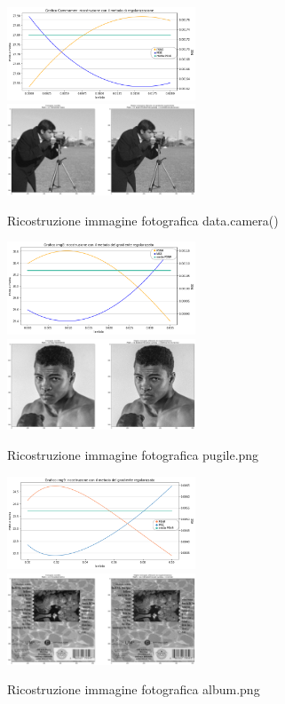 \begin{figure}[H]
    \includegraphics[width=0.5\textwidth]{IMMAGINI_RELAZIONE/graficoCameramanTik.png}
    \includegraphics[width=0.5\textwidth]{IMMAGINI_RELAZIONE/ricostruzioneCameramanTik.png}
    \caption{Ricostruzione immagine fotografica data.camera()}

    \includegraphics[width=0.5\textwidth]{IMMAGINI_RELAZIONE/graficoPugileTik.png}
    \includegraphics[width=0.5\textwidth]{IMMAGINI_RELAZIONE/ricostruzionePugileTik.png}
    \caption{Ricostruzione immagine fotografica pugile.png}

    \includegraphics[width=0.5\textwidth]{IMMAGINI_RELAZIONE/graficoAlbumTik.png}
    \includegraphics[width=0.5\textwidth]{IMMAGINI_RELAZIONE/ricostruzioneAlbumTik.png}
    \caption{Ricostruzione immagine fotografica album.png}
\end{figure}